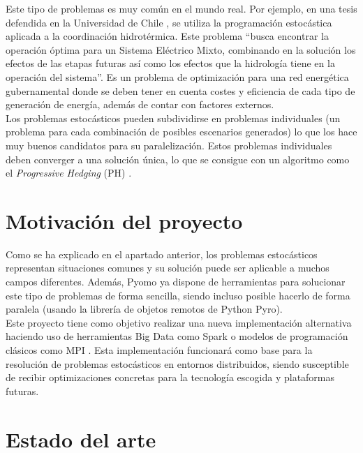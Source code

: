Este tipo de problemas es muy común en el mundo real. Por ejemplo, en una tesis defendida en la Universidad de Chile \cite{thesisHydro}, se utiliza la programación estocástica aplicada a la coordinación hidrotérmica. Este problema ``busca encontrar la operación óptima para un Sistema Eléctrico Mixto, combinando en la solución los efectos de las etapas futuras así como los efectos que la hidrología tiene en la operación del sistema''. Es un problema de optimización para una red energética gubernamental donde se deben tener en cuenta costes y eficiencia de cada tipo de generación de energía, además de contar con factores externos. \\

Los problemas estocásticos pueden subdividirse en problemas individuales (un problema para cada combinación de posibles escenarios generados) lo que los hace muy buenos candidatos para su paralelización. Estos problemas individuales deben converger a una solución única, lo que se consigue con un algoritmo como el \textit{Progressive Hedging} (PH) \cite{progressiveHedging}. 

\section{Motivación del proyecto}


Como se ha explicado en el apartado anterior, los problemas estocásticos representan situaciones comunes y su solución puede ser aplicable a muchos campos diferentes. Además, Pyomo ya dispone de herramientas para solucionar este tipo de problemas de forma sencilla, siendo incluso posible hacerlo de forma paralela (usando la librería de objetos remotos de Python Pyro).\\

Este proyecto tiene como objetivo realizar una nueva implementación alternativa haciendo uso de herramientas Big Data como Spark \cite{spark} o modelos de programación clásicos como MPI \cite{mpi}. Esta implementación funcionará como base para la resolución de problemas estocásticos en entornos distribuidos, siendo susceptible de recibir optimizaciones concretas para la tecnología escogida y plataformas futuras.

\section{Estado del arte}

